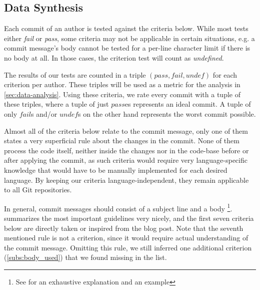 \subsection{Data Synthesis}
\label{sec:data-synthesis}

%
%
%
%
%
%

Each commit of an author is tested against the criteria below. While most tests either \emph{fail} or \emph{pass}, some criteria may not be applicable in certain situations, e.g. a commit message's body cannot be tested for a per-line character limit if there is no body at all. In those cases, the criterion test will count as \emph{undefined}.

The results of our tests are counted in a triple $(pass, fail, undef)$ for each criterion per author. These triples will be used as a metric for the analysis in \ref{sec:data-analysis}. Using these criteria, we rate every commit with a tuple of these triples, where a tuple of just $pass$es represents an ideal commit. A tuple of only $fail$s and/or $undef$s on the other hand represents the worst commit possible.

Almost all of the criteria below relate to the commit message, only one of them states a very superficial rule about the changes in the commit. None of them process the code itself, neither inside the changes nor in the code-base before or after applying the commit, as such criteria would require very language-specific knowledge that would have to be manually implemented for each desired language. By keeping our criteria language-independent, they remain applicable to all Git repositories.

In general, commit messages should consist of a subject line and a body \footnote{See \cite{OffGuide} for an exhaustive explanation and an example}. \cite{CB} summarizes the most important guidelines very nicely, and the first seven criteria below are directly taken or inspired from the blog post. Note that the seventh mentioned rule is not a criterion, since it would require actual understanding of the commit message. Omitting this rule, we still inferred one additional criterion (\ref{subs:body_used}) that we found missing in the list.

